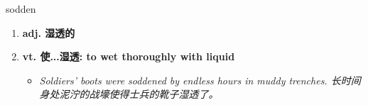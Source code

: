
\begin{frame}
{\huge sodden}
\begin{center}
\begin{enumerate}\Large
  \item \textbf{adj. 湿透的}
  \item \textbf{vt. 使...湿透: to wet thoroughly with liquid}
  \begin{itemize}
    \item \em{\Large{Soldiers' boots were soddened by endless hours in muddy trenches. 长时间身处泥泞的战壕使得士兵的靴子湿透了。}}
  \end{itemize}
\end{enumerate}
\end{center}
\end{frame}

